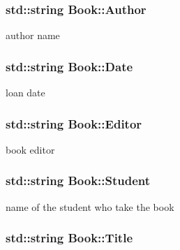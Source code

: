\subsubsection[{\texorpdfstring{Author}{Author}}]{\setlength{\rightskip}{0pt plus 5cm}std\+::string Book\+::\+Author\hspace{0.3cm}{\ttfamily [private]}}\hypertarget{classBook_a12872f571d8e7c5bfa31f4142e7848eb}{}\label{classBook_a12872f571d8e7c5bfa31f4142e7848eb}


author name 

\subsubsection[{\texorpdfstring{Date}{Date}}]{\setlength{\rightskip}{0pt plus 5cm}std\+::string Book\+::\+Date\hspace{0.3cm}{\ttfamily [private]}}\hypertarget{classBook_a45a1a5f93a5ec021cc605b0c905d1d6f}{}\label{classBook_a45a1a5f93a5ec021cc605b0c905d1d6f}


loan date 

\subsubsection[{\texorpdfstring{Editor}{Editor}}]{\setlength{\rightskip}{0pt plus 5cm}std\+::string Book\+::\+Editor\hspace{0.3cm}{\ttfamily [private]}}\hypertarget{classBook_a18602b69a54cf1533569ac857681b03f}{}\label{classBook_a18602b69a54cf1533569ac857681b03f}


book editor 

\subsubsection[{\texorpdfstring{Student}{Student}}]{\setlength{\rightskip}{0pt plus 5cm}std\+::string Book\+::\+Student\hspace{0.3cm}{\ttfamily [private]}}\hypertarget{classBook_ae89daf9343a917dced86da884961ed3a}{}\label{classBook_ae89daf9343a917dced86da884961ed3a}


name of the student who take the book 

\subsubsection[{\texorpdfstring{Title}{Title}}]{\setlength{\rightskip}{0pt plus 5cm}std\+::string Book\+::\+Title\hspace{0.3cm}{\ttfamily [private]}}\hypertarget{classBook_a862b94a2fd16ac90209afa4393d8df8a}{}\label{classBook_a862b94a2fd16ac90209afa4393d8df8a}


